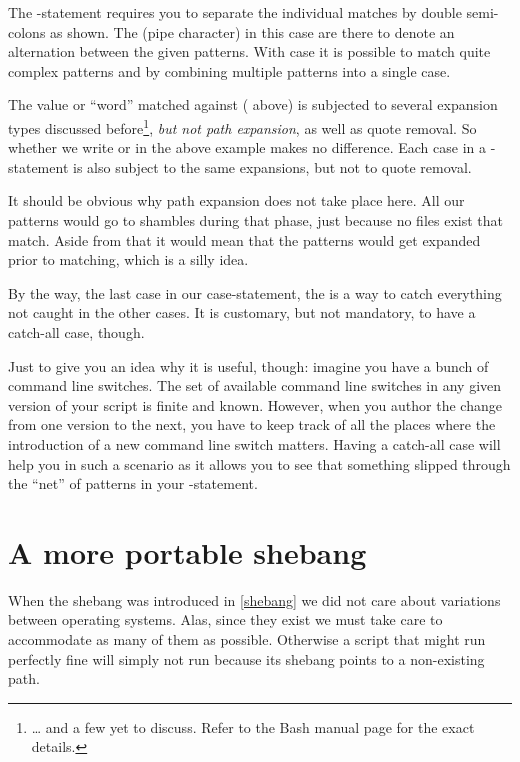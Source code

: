 \documentclass{olli-handout}
\begin{document}
The -statement requires you to separate the individual matches by double semi-colons as shown. The \TTQ{\textbar} (pipe character) in this case are there to denote an alternation between the given patterns. With case it is possible to match quite complex patterns and by combining multiple patterns into a single case.

The value or ``word'' matched against ( above) is subjected to several expansion types discussed before\footnote{\ldots{} and a few yet to discuss. Refer to the Bash manual page for the exact details.}, \emph{but not path expansion}, as well as quote removal. So whether we write  or  in the above example makes no difference. Each case in a -statement is also subject to the same expansions, but not to quote removal.

\begin{hintbox}
    {\olliPenR} It should be obvious why path expansion does not take place here. All our patterns would go to shambles during that phase, just because no files exist that match. Aside from that it would mean that the patterns would get expanded prior to matching, which is a silly idea.
\end{hintbox}

By the way, the last case in our case-statement, the \TTQ{*)} is a way to catch everything not caught in the other cases. It is customary, but not mandatory, to have a catch-all case, though.

Just to give you an idea why it is useful, though: imagine you have a bunch of command line switches. The set of available command line switches in any given version of your script is finite and known. However, when you author the change from one version to the next, you have to keep track of all the places where the introduction of a new command line switch matters. Having a catch-all case will help you in such a scenario as it allows you to see that something slipped through the ``net'' of patterns in your -statement.

\section{A more portable shebang}

When the shebang was introduced in \vref{shebang} we did not care about variations between operating systems. Alas, since they exist we must take care to accommodate as many of them as possible. Otherwise a script that might run perfectly fine will simply not run because its shebang points to a non-existing path.
\end{document}
